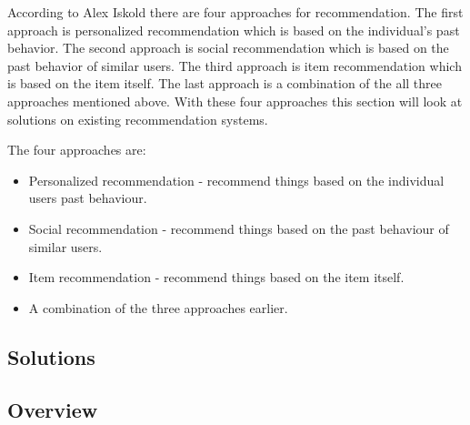 According to Alex Iskold \cite{ReadWrite} there are four approaches for recommendation. The first approach is personalized recommendation which is based on the individual’s past behavior. The second approach is social recommendation which is based on the past behavior of similar users. The third approach is item recommendation which is based on the item itself. The last approach is a combination of the all three approaches mentioned above. With these four approaches this section will look at solutions on existing recommendation systems.


The four approaches are:

\begin{itemize}
	\item Personalized recommendation - recommend things based on the individual users past behaviour. 
	\item Social recommendation - recommend things based on the past behaviour of similar users. 
	\item Item recommendation - recommend things based on the item itself.
	\item A combination of the three approaches earlier.
\end{itemize}

\subsection{Solutions}
\label{Solutions}

\subsection{Overview}
\label{SolutionOverview}
